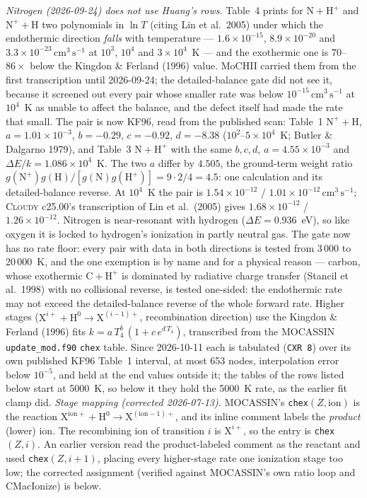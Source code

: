 \documentclass[english,a4paper]{my_memo}
\newcommand{\code}[1]{\texttt{#1}}
\newcommand{\cmc}{\mathrm{cm^{3}\,s^{-1}}}
\begin{document}
\emph{Nitrogen (2026-09-24) does not use Huang's rows.}  Table~4 prints
for $\mathrm{N} + \mathrm{H}^+$ and $\mathrm{N}^+ + \mathrm{H}$ two
polynomials in $\ln T$ (citing Lin et al.\ 2005) under which the
endothermic direction \emph{falls} with temperature --- $1.6{\times}10^{-15}$,
$8.9{\times}10^{-20}$ and $3.3{\times}10^{-23}\,\cmc$ at $10^3$, $10^4$ and
$3{\times}10^4$~K --- and the exothermic one is $70$--$86\times$ below the
Kingdon \& Ferland (1996) value.  MoCHII carried them from the first
transcription until 2026-09-24; the detailed-balance gate did not see it,
because it screened out every pair whose smaller rate was below
$10^{-15}\,\cmc$ at $10^4$~K as unable to affect the balance, and the
defect itself had made the rate that small.  The pair is now KF96,
read from the published scan: Table~1
$\mathrm{N}^+ + \mathrm{H}$, $a = 1.01{\times}10^{-3}$, $b = -0.29$,
$c = -0.92$, $d = -8.38$ ($10^2$--$5{\times}10^4$~K; Butler \& Dalgarno
1979), and Table~3 $\mathrm{N} + \mathrm{H}^+$ with the same $b, c, d$,
$a = 4.55{\times}10^{-3}$ and $\Delta E/k = 1.086{\times}10^4$~K.  The two
$a$ differ by $4.505$, the ground-term weight ratio
$g(\mathrm{N}^+)g(\mathrm{H})/[g(\mathrm{N})g(\mathrm{H}^+)] = 9\cdot2/4 =
4.5$: one calculation and its detailed-balance reverse.  At $10^4$~K the
pair is $1.54{\times}10^{-12}$ / $1.01{\times}10^{-12}\,\cmc$;
\textsc{Cloudy} c25.00's transcription of Lin et al.\ (2005) gives
$1.68{\times}10^{-12}$ / $1.26{\times}10^{-12}$.  Nitrogen is
near-resonant with hydrogen ($\Delta E = 0.936$~eV), so like oxygen it is
locked to hydrogen's ionization in partly neutral gas.  The gate now has
no rate floor: every pair with data in both directions is tested from
3\,000 to 20\,000~K, and the one exemption is by name and for a physical
reason --- carbon, whose exothermic $\mathrm{C} + \mathrm{H}^+$ is
dominated by radiative charge transfer (Stancil et al.\ 1998) with no
collisional reverse, is tested one-sided: the endothermic rate may not
exceed the detailed-balance reverse of the whole forward rate.
Higher stages ($\mathrm{X}^{i+} + \mathrm{H}^0 \to
\mathrm{X}^{(i-1)+}$, recombination direction) use the Kingdon \&
Ferland (1996) fits $k = a\,T_4^{b}\,(1 + c\,e^{d\,T_4})$, transcribed
from the MOCASSIN \code{update\_mod.f90} \code{chex} table.  Since
2026-10-11 each is tabulated (\code{CXR 8}) over its own published KF96
Table~1 interval, at most 653 nodes, interpolation error below $10^{-5}$,
and held at the end values outside it; the tables of the rows listed below
start at 5000~K, so below it they hold the 5000~K rate, as the earlier fit
clamp did.
\emph{Stage mapping (corrected 2026-07-13).}  MOCASSIN's
\code{chex}$(Z,\mathrm{ion})$ is the reaction
$\mathrm{X}^{\mathrm{ion}+} + \mathrm{H}^0 \to
\mathrm{X}^{(\mathrm{ion}-1)+}$, and its inline comment labels the
\emph{product} (lower) ion.  The recombining ion of transition $i$ is
$\mathrm{X}^{i+}$, so the entry is \code{chex}$(Z,i)$.  An earlier
version read the product-labeled comment as the reactant and used
\code{chex}$(Z,i{+}1)$, placing every higher-stage rate one ionization
stage too low; the corrected assignment (verified against MOCASSIN's own
ratio loop and CMacIonize) is below.
\end{document}
